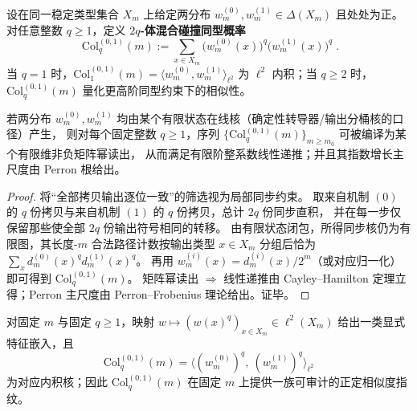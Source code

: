 \begin{definition}[混合碰撞同型概率]\label{def:pom-mixed-collision-probability}
设在同一稳定类型集合 \(X_m\) 上给定两分布 \(w_m^{(0)},w_m^{(1)}\in\Delta(X_m)\) 且处处为正。
对任意整数 \(q\ge 1\)，定义 \textbf{\(2q\)-体混合碰撞同型概率}
\[
\boxed{\;
\mathrm{Col}^{(0,1)}_q(m)
:=
\sum_{x\in X_m}\bigl(w_m^{(0)}(x)\bigr)^q\bigl(w_m^{(1)}(x)\bigr)^q\; }.
\]
当 \(q=1\) 时，\(\mathrm{Col}^{(0,1)}_1(m)=\langle w_m^{(0)},w_m^{(1)}\rangle_{\ell^2}\) 为 \(\ell^2\) 内积；当 \(q\ge 2\) 时，\(\mathrm{Col}^{(0,1)}_q(m)\) 量化更高阶同型约束下的相似性。
\end{definition}

\begin{proposition}[混合碰撞核的有限态可计算性]\label{prop:pom-mixed-collision-kernel-computable}
若两分布 \(w_m^{(0)},w_m^{(1)}\) 均由某个有限状态在线核（确定性转导器/输出分桶核的口径）产生，
则对每个固定整数 \(q\ge 1\)，序列 \(\{\mathrm{Col}^{(0,1)}_q(m)\}_{m\ge m_0}\) 可被编译为某个有限维非负矩阵幂读出，
从而满足有限阶整系数线性递推；并且其指数增长主尺度由 Perron 根给出。
\end{proposition}
\begin{proof}
将“全部拷贝输出逐位一致”的筛选视为局部同步约束。
取来自机制 \((0)\) 的 \(q\) 份拷贝与来自机制 \((1)\) 的 \(q\) 份拷贝，总计 \(2q\) 份同步直积，
并在每一步仅保留那些使全部 \(2q\) 份输出符号相同的转移。
由有限状态闭包，所得同步核仍为有限图，其长度-\(m\) 合法路径计数按输出类型 \(x\in X_m\) 分组后恰为
\(\sum_x d_m^{(0)}(x)^q d_m^{(1)}(x)^q\)。
再用 \(w_m^{(i)}(x)=d_m^{(i)}(x)/2^m\)（或对应归一化）即可得到 \(\mathrm{Col}^{(0,1)}_q(m)\)。
矩阵幂读出 \(\Rightarrow\) 线性递推由 Cayley--Hamilton 定理立得；Perron 主尺度由 Perron--Frobenius 理论给出。证毕。
\end{proof}

\begin{corollary}\label{cor:pom-mixed-collision-pd-kernel}
对固定 \(m\) 与固定 \(q\ge 1\)，映射
\(
w\mapsto (w(x)^q)_{x\in X_m}\in \ell^2(X_m)
\)
给出一类显式特征嵌入，且
\[
\boxed{\;
\mathrm{Col}^{(0,1)}_q(m)
=\big\langle (w_m^{(0)})^q,\ (w_m^{(1)})^q\big\rangle_{\ell^2}\;}
\]
为对应内积核；因此 \(\mathrm{Col}^{(0,1)}_q(m)\) 在固定 \(m\) 上提供一族可审计的正定相似度指纹。
\end{corollary}

